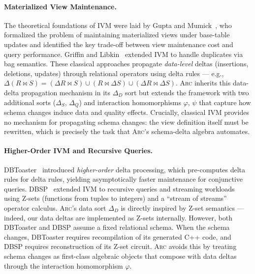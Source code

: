 \documentclass[sigplan,screen,nonacm]{acmart}
\newcommand{\arc}{\textsc{Arc}\xspace}
\newcommand{\DeltaS}{\Delta_{\!S}}
\newcommand{\DeltaD}{\Delta_{\!D}}
\newcommand{\DeltaQ}{\Delta_{\!Q}}
\begin{document}
\paragraph{Materialized View Maintenance.}
The theoretical foundations of IVM were laid by Gupta and
Mumick~\cite{gupta1995maintenance}, who formalized the problem of
maintaining materialized views under base-table updates and identified
the key trade-off between view maintenance cost and query performance.
Griffin and Libkin~\cite{griffin1997improved} extended IVM to handle
duplicates via bag semantics.  These classical approaches propagate
\emph{data-level} deltas (insertions, deletions, updates) through
relational operators using delta rules --- e.g., $\Delta(R \bowtie S)
= (\Delta R \bowtie S) \cup (R \bowtie \Delta S) \cup (\Delta R
\bowtie \Delta S)$.  \arc inherits this data-delta propagation
mechanism in its $\DeltaD$ sort but extends the framework with two
additional sorts ($\DeltaS$, $\DeltaQ$) and interaction homomorphisms
$\varphi$, $\psi$ that capture how schema changes induce data and
quality effects.  Crucially, classical IVM provides no mechanism for
propagating schema changes: the view definition itself must be
rewritten, which is precisely the task that \arc's schema-delta
algebra automates.

\paragraph{Higher-Order IVM and Recursive Queries.}
DBToaster~\cite{koch2014dbtoaster} introduced \emph{higher-order} delta
processing, which pre-computes delta rules for delta rules, yielding
asymptotically faster maintenance for conjunctive queries.
DBSP~\cite{budiu2023dbsp} extended IVM to recursive queries and
streaming workloads using Z-sets (functions from tuples to integers)
and a ``stream of streams'' operator calculus.  \arc's data sort
$\DeltaD$ is directly inspired by Z-set semantics --- indeed, our
data deltas are implemented as Z-sets internally.  However, both
DBToaster and DBSP assume a fixed relational schema.  When the schema
changes, DBToaster requires recompilation of its generated C++ code,
and DBSP requires reconstruction of its Z-set circuit.  \arc avoids
this by treating schema changes as first-class algebraic objects
that compose with data deltas through the interaction homomorphism
$\varphi$.
\end{document}
